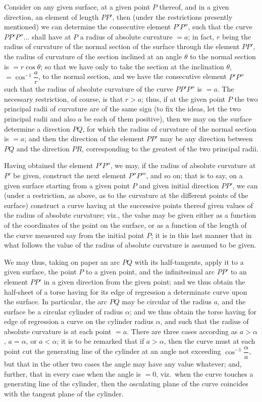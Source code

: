 \documentclass[11pt,a4paper]{article}
\begin{document}
Consider on any given surface, at a given point $P$ thereof, and in a given direction, an element of length $PP'$, then (under the restrictions presently mentioned) we can determine the consecutive element $P'P''$, such that the curve $PP'P''\ldots$ shall have at $P$ a radius of absolute curvature $= a$; in fact, $r$ being the radius of curvature of the normal section of the surface through the element $PP'$, the radius of curvature of the section inclined at an angle $\theta$ to the normal section is $= r\cos\theta$; so that we have only to take the section at the inclination $\theta$, $= \cos^{-1}\dfrac{a}{r}$, to the normal section, and we have the consecutive element $P'P''$ such that the radius of absolute curvature of the curve $PP'P''$ is $= a$. The necessary restriction, of course, is that $r > a$; thus, if at the given point $P$ the two principal radii of curvature are of the same sign (to fix the ideas, let the two principal radii and also $a$ be each of them positive), then we may on the surface determine a direction $PQ$, for which the radius of curvature of the normal section is $= a$; and then the direction of the element $PP'$ may be any direction between $PQ$ and the direction $PR$, corresponding to the greatest of the two principal radii.

Having obtained the element $P'P''$, we may, if the radius of absolute curvature at $P'$ be given, construct the next element $P''P'''$, and so on; that is to say, on a given surface starting from a given point $P$ and given initial direction $PP'$, we can (under a restriction, as above, as to the curvature at the different points of the surface) construct a curve having at the successive points thereof given values of the radius of absolute curvature; viz., the value may be given either as a function of the coordinates of the point on the surface, or as a function of the length of the curve measured say from the initial point $P$; it is in this last manner that in what follows the value of the radius of absolute curvature is assumed to be given.

We may thus, taking on paper an arc $PQ$ with its half-tangents, apply it to a given surface, the point $P$ to a given point, and the infinitesimal arc $PP'$ to an element $PP'$ in a given direction from the given point; and we thus obtain the half-sheet of a torse having for its edge of regression a determinate curve upon the surface. In particular, the arc $PQ$ may be circular of the radius $a$, and the surface be a circular cylinder of radius $\alpha$; and we thus obtain the torse having for edge of regression a curve on the cylinder radius $\alpha$, and such that the radius of absolute curvature is at each point $= a$. There are three cases according as $a > \alpha$, $a = \alpha$, or $a < \alpha$; it is to be remarked that if $a > \alpha$, then the curve must at each point cut the generating line of the cylinder at an angle not exceeding $\cos^{-1}\dfrac{\alpha}{a}$, but that in the other two cases the angle may have any value whatever; and, further, that in every case when the angle is $= 0$, viz.\ when the curve touches a generating line of the cylinder, then the osculating plane of the curve coincides with the tangent plane of the cylinder.
\end{document}
